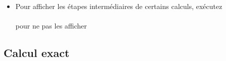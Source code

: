 \documentclass[a4paper,11pt]{article}
\begin{document}
\begin{giacjshere}
\begin{itemize}
\`a repr\'esenter des vecteurs. Les listes de listes de m\^eme taille
servent \`a repr\'esenter des matrices. On acc\`ede \`a un \'el\'ement
d'une liste en donnant le nom de variable de la liste puis l'indice
de l'\'el\'ement entre crochet, en commen\c{c}ant \`a 0 (mettre deux crochets
pour commencer \`a 1).
\item Pour afficher les \'etapes interm\'ediaires de certains calculs, ex\'ecutez\\
\\
pour ne pas les afficher\\
\end{itemize}

\subsection{Calcul exact}

\end{giacjshere}
\end{document}
